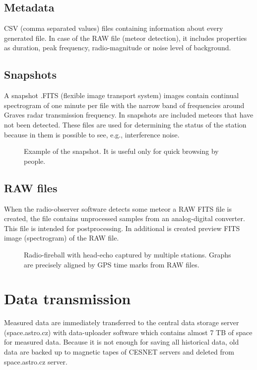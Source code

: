 \documentclass[10pt,a4paper,twoside,dvips]{article}
\begin{document}
\begin{IMCpaper}
\subsection{Metadata}
CSV (comma separated values) files containing information about every generated file. In case of the RAW file (meteor detection), it includes properties as duration, peak frequency, radio-magnitude or noise level of background.                                             

\subsection{Snapshots}
A snapshot .FITS (flexible image transport system) images contain continual spectrogram of one minute per file with the narrow band of frequencies around Graves radar transmission frequency. In snapshots are included meteors that have not been detected. These files are used for determining the status of the station because in them is possible to see, e.g., interference noise.                                                      
\begin{figure}[htb]
\centering
{}
\caption{Example of the snapshot. It is useful only for quick browsing by people.}%
\label{snap}
\end{figure}


\subsection{RAW files}
When the radio-observer software detects some meteor a RAW FITS file is created, the file contains unprocessed samples from an analog-digital converter. This file is intended for postprocessing. In additional is created preview FITS image (spectrogram) of the RAW file. 

\begin{figure}[htb]
\centering
{}
\caption{Radio-fireball with head-echo captured by multiple stations. Graphs are precisely aligned by GPS time marks from RAW files.}%
\label{mb}
\end{figure}

\section{Data transmission}
Measured data are immediately transferred to the central data storage server  (space.astro.cz) with data-uploader software which contains almost 7 TB of space for measured data. Because it is not enough for saving all historical data, old data are backed up to magnetic tapes of CESNET servers and deleted from space.astro.cz server.                                                                                 


\end{IMCpaper}
\end{document}
